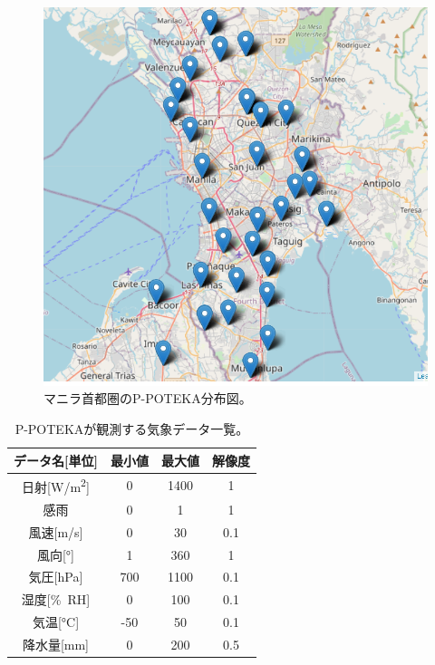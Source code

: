 \begin{figure}[H]
\begin{center}
\includegraphics[width=0.8\linewidth]{fig/methodologies/poteka-distribution-map.png}
\captionsetup{width=0.8\linewidth}
\caption{マニラ首都圏のP-POTEKA分布図。}
\label{fig:poteka-distribution-map}
\end{center}
\end{figure}


\begin{table}[h]
\caption{P-POTEKAが観測する気象データ一覧。}
\label{tb:poteka-observation-parameters}
\centering
\begin{tabular}{cccc}
\hline
データ名[単位] & 最小値 & 最大値 & 解像度 \\
\hline \hline
日射[\si{W/m^{2}}] & 0 & 1400 & 1 \\
感雨 & 0 & 1 & 1 \\
風速[\si{m/s}] & 0 & 30 & 0.1 \\
風向[\si{\degree}] & 1 & 360 & 1 \\
気圧[\si{hPa}] & 700 & 1100 & 0.1 \\
湿度[\si{\%RH}] & 0 & 100 & 0.1 \\
気温[\si{\degreeCelsius}] & -50 & 50 & 0.1 \\
降水量[\si{mm}] & 0 & 200 & 0.5 \\
\hline
\end{tabular}
\end{table}

